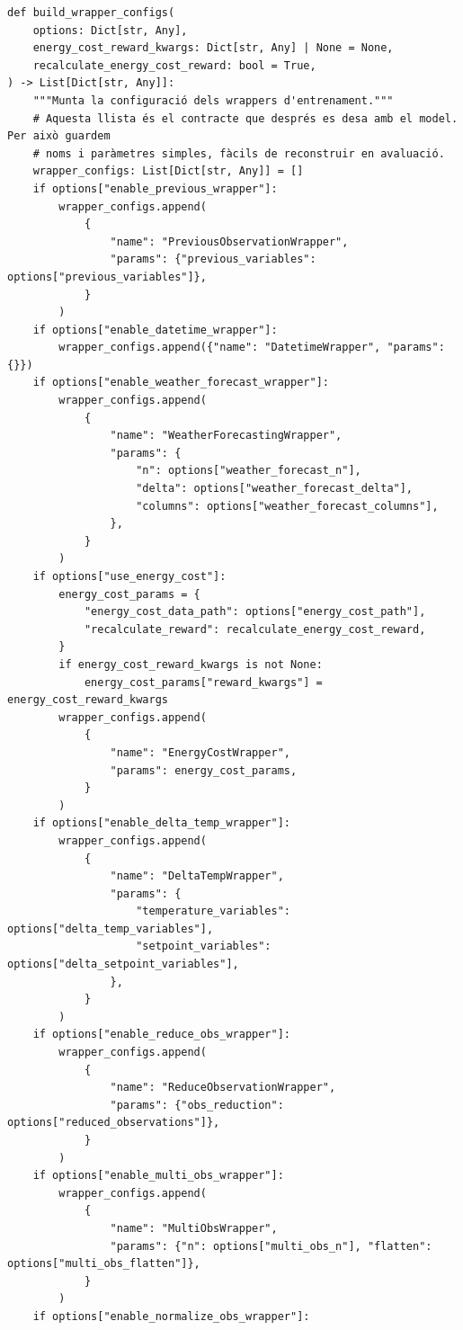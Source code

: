 \documentclass[10pt,a4paper]{article}
\begin{document}
\begin{lstlisting}[style=studioPython,caption={backend/entrenar\_agent\_wrappers.py},label={lst:backend-entrenar-agent-wrappers-py}]
def build_wrapper_configs(
    options: Dict[str, Any],
    energy_cost_reward_kwargs: Dict[str, Any] | None = None,
    recalculate_energy_cost_reward: bool = True,
) -> List[Dict[str, Any]]:
    """Munta la configuració dels wrappers d'entrenament."""
    # Aquesta llista és el contracte que després es desa amb el model. Per això guardem
    # noms i paràmetres simples, fàcils de reconstruir en avaluació.
    wrapper_configs: List[Dict[str, Any]] = []
    if options["enable_previous_wrapper"]:
        wrapper_configs.append(
            {
                "name": "PreviousObservationWrapper",
                "params": {"previous_variables": options["previous_variables"]},
            }
        )
    if options["enable_datetime_wrapper"]:
        wrapper_configs.append({"name": "DatetimeWrapper", "params": {}})
    if options["enable_weather_forecast_wrapper"]:
        wrapper_configs.append(
            {
                "name": "WeatherForecastingWrapper",
                "params": {
                    "n": options["weather_forecast_n"],
                    "delta": options["weather_forecast_delta"],
                    "columns": options["weather_forecast_columns"],
                },
            }
        )
    if options["use_energy_cost"]:
        energy_cost_params = {
            "energy_cost_data_path": options["energy_cost_path"],
            "recalculate_reward": recalculate_energy_cost_reward,
        }
        if energy_cost_reward_kwargs is not None:
            energy_cost_params["reward_kwargs"] = energy_cost_reward_kwargs
        wrapper_configs.append(
            {
                "name": "EnergyCostWrapper",
                "params": energy_cost_params,
            }
        )
    if options["enable_delta_temp_wrapper"]:
        wrapper_configs.append(
            {
                "name": "DeltaTempWrapper",
                "params": {
                    "temperature_variables": options["delta_temp_variables"],
                    "setpoint_variables": options["delta_setpoint_variables"],
                },
            }
        )
    if options["enable_reduce_obs_wrapper"]:
        wrapper_configs.append(
            {
                "name": "ReduceObservationWrapper",
                "params": {"obs_reduction": options["reduced_observations"]},
            }
        )
    if options["enable_multi_obs_wrapper"]:
        wrapper_configs.append(
            {
                "name": "MultiObsWrapper",
                "params": {"n": options["multi_obs_n"], "flatten": options["multi_obs_flatten"]},
            }
        )
    if options["enable_normalize_obs_wrapper"]:

\end{lstlisting}
\end{document}
